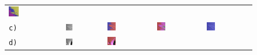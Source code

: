 \begin{figure}[h!]
\begin{tabular}{m{15pt}m{}m{}m{}m{}}
		\includegraphics[width=0.2\textwidth]{images/gen/fully_connected/p03_02.png_2.png} \\
		\texttt{c)} &
		\includegraphics[width=0.2\textwidth]{images/p03/p03_03.png} &
		\includegraphics[width=0.2\textwidth]{images/gen/fully_connected/p03_03.png_0.png} &
		\includegraphics[width=0.2\textwidth]{images/gen/fully_connected/p03_03.png_1.png} &
		\includegraphics[width=0.2\textwidth]{images/gen/fully_connected/p03_03.png_2.png} \\
		\texttt{d)} &
		\includegraphics[width=0.2\textwidth]{images/p03/p03_04.png} &
		\includegraphics[width=0.2\textwidth]{images/gen/fully_connected/p03_04.png_0.png} &

\end{tabular}
\end{figure}
